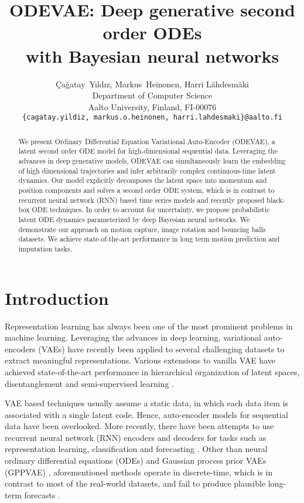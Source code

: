 \documentclass{article}
\title{ODEVAE: Deep generative second order ODEs \\ with Bayesian neural networks}
\author{\c{C}a\u{g}atay~Y{\i}ld{\i}z, Markus~Heinonen, Harri L{\"a}hdesm{\"a}ki \\
  Department of Computer Science\\
  Aalto University, Finland, FI-00076 \\
  \texttt{\{cagatay.yildiz, markus.o.heinonen, harri.lahdesmaki\}@aalto.fi}
}
\newcommand{\0}{\mathbf{0}}
\begin{document}
\maketitle

\begin{abstract}
We present Ordinary Differential Equation Variational Auto-Encoder (ODEVAE), a latent second order ODE model for high-dimensional sequential data. Leveraging the advances in deep generative models, ODEVAE can simultaneously learn the embedding of high dimensional trajectories and infer arbitrarily complex continuous-time latent dynamics. Our model explicitly decomposes the latent space into momentum and position components and solves a second order ODE system, which is in contrast to recurrent neural network (RNN) based time series models and recently proposed black-box ODE techniques. In order to account for uncertainty, we propose probabilistic latent ODE dynamics parameterized by deep Bayesian neural networks. We demonstrate our approach on motion capture, image rotation and bouncing balls datasets. We achieve state-of-the-art performance in long term motion prediction and imputation tasks.
\end{abstract}




\section{Introduction}
Representation learning has always been one of the most prominent problems in machine learning. Leveraging the advances in deep learning, variational auto-encoders (VAEs) have recently been applied to several challenging datasets to extract meaningful representations. Various extensions to vanilla VAE have achieved state-of-the-art performance in hierarchical organization of latent spaces, disentanglement and semi-supervised learning \citep{tschannen2018recent}. 

VAE based techniques usually assume a static data, in which each data item is associated with a single latent code. Hence, auto-encoder models for sequential data have been overlooked. More recently, there have been attempts to use recurrent neural network (RNN) encoders and decoders for tasks such as representation learning, classification and forecasting \citep{srivastava2015unsupervised,lotter2016deep,hsu2017unsupervised,li2018disentangled}. Other than neural ordinary differential equations (ODEs) \citep{chen2018neural} and Gaussian process prior VAEs (GPPVAE) \citep{casale2018gaussian}, aforementioned methods operate in discrete-time, which is in contrast to most of the real-world datasets, and fail to produce plausible long-term forecasts \citep{karl2016deep}. 
\end{document}
